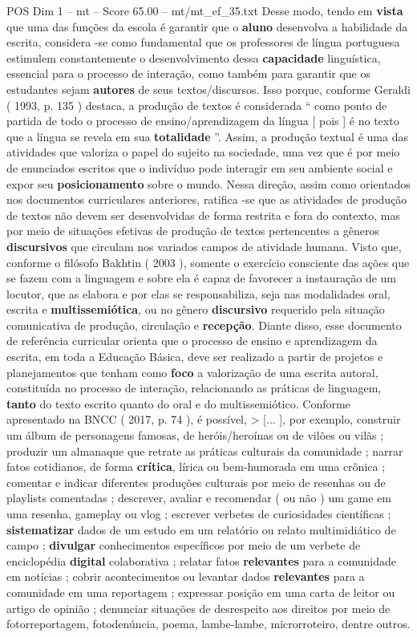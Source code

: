 \begin{textsample}{POS Dim 1 – mt – Score 65.00 – mt/mt\_ef\_35.txt}
Desse modo, tendo em \textbf{vista} que uma das funções da escola é garantir que o \textbf{aluno} desenvolva a habilidade da escrita, considera -se como fundamental que os professores de língua portuguesa estimulem constantemente o desenvolvimento dessa \textbf{capacidade} linguística, essencial para o processo de interação, como também para garantir que os estudantes sejam \textbf{autores} de seus textos/discursos.
Isso porque, conforme Geraldi ( 1993, p. 135 ) destaca, a produção de textos é considerada “ como ponto de partida de todo o processo de ensino/aprendizagem da língua [ pois ] é no texto que a língua se revela em sua \textbf{totalidade} ”.
Assim, a produção textual é uma das atividades que valoriza o papel do sujeito na sociedade, uma vez que é por meio de enunciados escritos que o indivíduo pode interagir em seu ambiente social e expor seu \textbf{posicionamento} sobre o mundo.
Nessa direção, assim como orientados nos documentos curriculares anteriores, ratifica -se que as atividades de produção de textos não devem ser desenvolvidas de forma restrita e fora do contexto, mas por meio de situações efetivas de produção de textos pertencentes a gêneros \textbf{discursivos} que circulam nos variados campos de atividade humana.
Visto que, conforme o filósofo Bakhtin ( 2003 ), somente o exercício consciente das ações que se fazem com a linguagem e sobre ela é capaz de favorecer a instauração de um locutor, que as elabora e por elas se responsabiliza, seja nas modalidades oral, escrita e \textbf{multissemiótica}, ou no gênero \textbf{discursivo} requerido pela situação comunicativa de produção, circulação e \textbf{recepção}.
Diante disso, esse documento de referência curricular orienta que o processo de ensino e aprendizagem da escrita, em toda a Educação Básica, deve ser realizado a partir de projetos e planejamentos que tenham como \textbf{foco} a valorização de uma escrita autoral, constituída no processo de interação, relacionando as práticas de linguagem, \textbf{tanto} do texto escrito quanto do oral e do multissemiótico.
Conforme apresentado na BNCC ( 2017, p. 74 ), é possível, > [... ], por exemplo, construir um álbum de personagens famosas, de heróis/heroínas ou de vilões ou vilãs ; produzir um almanaque que retrate as práticas culturais da comunidade ; narrar fatos cotidianos, de forma \textbf{crítica}, lírica ou bem-humorada em uma crônica ; comentar e indicar diferentes produções culturais por meio de resenhas ou de playlists comentadas ; descrever, avaliar e recomendar ( ou não ) um game em uma resenha, gameplay ou vlog ; escrever verbetes de curiosidades científicas ; \textbf{sistematizar} dados de um estudo em um relatório ou relato multimidiático de campo ; \textbf{divulgar} conhecimentos específicos por meio de um verbete de enciclopédia \textbf{digital} colaborativa ; relatar fatos \textbf{relevantes} para a comunidade em notícias ; cobrir acontecimentos ou levantar dados \textbf{relevantes} para a comunidade em uma reportagem ; expressar posição em uma carta de leitor ou artigo de opinião ; denunciar situações de desrespeito aos direitos por meio de fotorreportagem, fotodenúncia, poema, lambe-lambe, microrroteiro, dentre outros.

\end{textsample}
